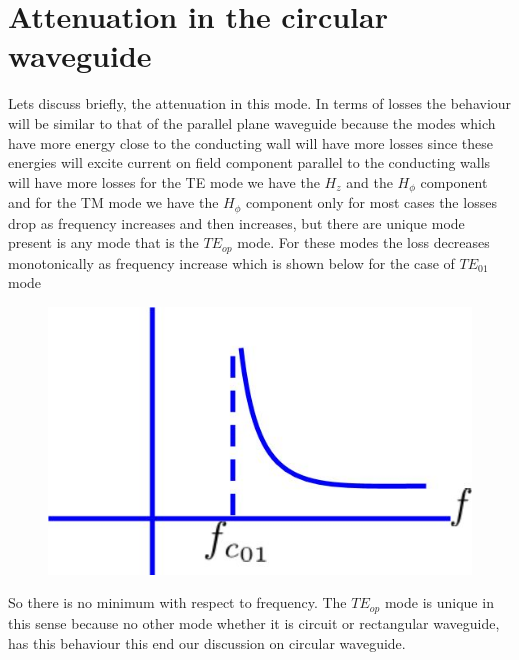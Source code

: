 \section{Attenuation in the circular waveguide}
 Lets discuss briefly, the attenuation in this mode. In terms of losses the behaviour will be similar to that of the parallel plane waveguide because the modes which have more energy close to the conducting wall will have more losses since these energies will excite current on field component parallel to the conducting walls will have more losses for the TE mode we have the $H_z$ and the $H_\phi$ component and for the TM mode we have the $H_\phi$ component only for most cases the losses drop as frequency increases and then increases, but there are unique mode present is any mode that is the $TE_{op}$ mode. For these modes the loss decreases monotonically as frequency increase which is shown below for the case of $TE_{01}$ mode 
\begin{figure}[h]
\centering
\includegraphics[width=.5\linewidth]{./graphics/m6}
\caption{}
\label{fig:m6}
\end{figure}

So there is no minimum with respect to frequency. The $TE_{op}$ mode is unique in this sense because no other mode whether it is circuit or rectangular waveguide, has this behaviour this end our discussion on circular waveguide.